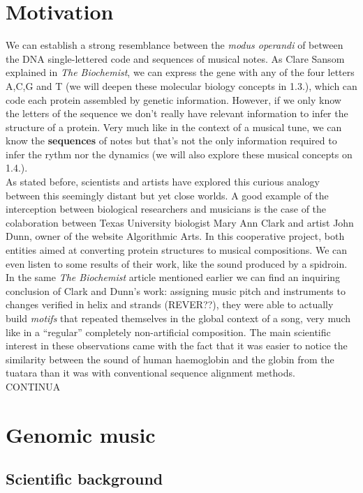 \documentclass[11pt,twoside,a4paper]{report}
\begin{document}
\section{Motivation}
We can establish a strong resemblance between the \textit{modus operandi} of between the DNA single-lettered code and sequences of musical notes. As Clare Sansom explained in \textit{The Biochemist}\cite{cyberbio}, we can express the gene with any of the four letters A,C,G and T (we will deepen these molecular biology concepts in 1.3.), which can code each protein assembled by genetic information. However, if we only know the letters of the sequence we don't really have relevant information to infer the structure of a protein. Very much like in the context of a musical tune, we can know the \textbf{sequences} of notes but that's not the only information required to infer the rythm nor the dynamics (we will also explore these musical concepts on 1.4.).  \\
As stated before, scientists and artists have explored this curious analogy between this seemingly distant but yet close worlds. A good example of the interception between biological researchers and musicians is the case of the colaboration between Texas University biologist Mary Ann Clark and artist John Dunn, owner of the website Algorithmic Arts\cite{algoart}. In this cooperative project, both entities aimed at converting protein structures to musical compositions. We can even listen to some results of their work, like the sound produced by a spidroin. In the same \textit{The Biochemist} article mentioned earlier we can find an inquiring conclusion of Clark and Dunn's work: assigning music pitch and instruments to changes verified in helix and strands (REVER??), they were able to actually build \textit{motifs} that repeated themselves in the global context of a song, very much like in a ``regular'' completely non-artificial composition. The main scientific interest in these observations came with the fact that it was easier to notice the similarity between the sound of human haemoglobin and the globin from the tuatara than it was with conventional sequence alignment methods. \\
CONTINUA

\section{Genomic music}
\subsection{Scientific background}
\end{document}
